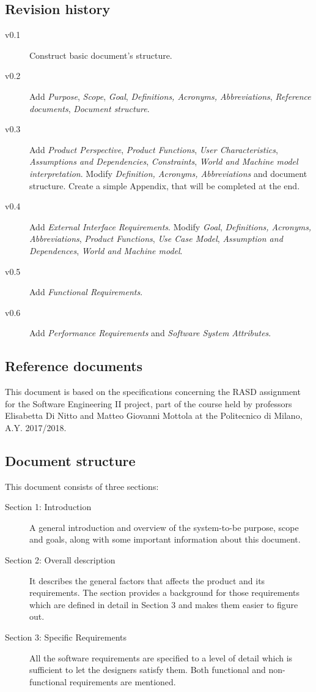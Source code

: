 \documentclass{article}
\begin{document}
	\subsection{Revision history}
	\begin{description}
		\item[v0.1] Construct basic document's structure.
		\item[v0.2] Add \textit{Purpose}, \textit{Scope}, \textit{Goal}, \textit{Definitions, Acronyms, Abbreviations}, \textit{Reference documents}, \textit{Document structure}.
		\item[v0.3] Add \textit{Product Perspective}, \textit{Product Functions}, \textit{User Characteristics}, \textit{Assumptions and Dependencies}, \textit{Constraints}, \textit{World and Machine model interpretation}. Modify \textit{Definition, Acronyms, Abbreviations} and document structure. Create a simple Appendix, that will be completed at the end.
		\item[v0.4] Add \textit{External Interface Requirements}. Modify \textit{Goal}, \textit{Definitions, Acronyms, Abbreviations}, \textit{Product Functions}, \textit{Use Case Model}, \textit{Assumption and Dependences}, \textit{World and Machine model}.
		\item[v0.5] Add \textit{Functional Requirements}.
		\item[v0.6] Add \textit{Performance Requirements} and \textit{Software System Attributes}.
	\end{description}
	
	
	\subsection{Reference documents}
	This document is based on the specifications concerning the RASD assignment for the Software Engineering II project, part of the course held by professors Elisabetta Di Nitto and Matteo Giovanni Mottola at the Politecnico di Milano, A.Y. 2017/2018.
	
	
	\subsection{Document structure}
	This document consists of three sections:

	\begin{description}
		\item[Section 1: Introduction] A general introduction and overview of the system-to-be purpose, scope and goals, along with some important information about this document.
		\item[Section 2: Overall description] It describes the general factors that affects the product and its requirements. The section provides a background for those requirements which are defined in detail in Section 3 and makes them easier to figure out.
		\item[Section 3: Specific Requirements] All the software requirements are specified to a level of detail which is sufficient to let the designers satisfy them. Both functional and non-functional requirements are mentioned.
	\end{description}
	
\end{document}
